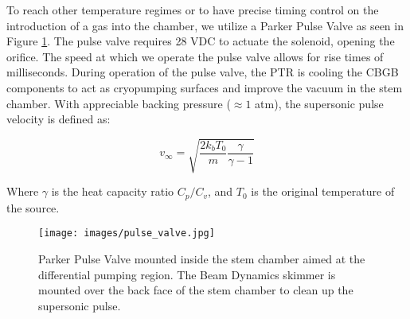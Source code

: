 To reach other temperature regimes or to have precise timing control on the introduction of a gas into the chamber, we utilize a Parker Pulse Valve as seen in Figure \ref{fig: general valve}. The pulse valve requires 28 VDC to actuate the solenoid, opening the orifice. The speed at which we operate the pulse valve allows for rise times of milliseconds. During operation of the pulse valve, the PTR is cooling the CBGB components to act as cryopumping surfaces and improve the vacuum in the stem chamber. With appreciable backing pressure ($\approx 1$ atm), the supersonic pulse velocity is defined as:\cite{Pauly}

\begin{equation*}
	v_\infty = \sqrt{\frac{2 k_b T_0}{m}\frac{\gamma}{\gamma - 1}}
\end{equation*}

Where $\gamma$ is the heat capacity ratio $C_p/C_v$, and $T_0$ is the original temperature of the source.

\begin{figure}
	\centering
	\texttt{[image: images/pulse\_valve.jpg]}
	\caption{Parker Pulse Valve mounted inside the stem chamber aimed at the differential pumping region. The Beam Dynamics skimmer is mounted over the back face of the stem chamber to clean up the supersonic pulse.}
	\label{fig: general valve}
\end{figure}
